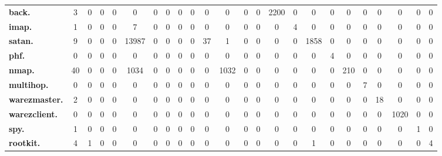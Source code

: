 \begin{tabular}{l|ccccccccccccccccccccccc}
\textbf{back.} & 3 & 0 & 0 & 0 & 0 & 0 & 0 & 0 & 0 & 0 & 0 & 0 & 0 & 2200 & 0 & 0 & 0 & 0 & 0 & 0 & 0 & 0 & 0\\
\textbf{imap.} & 1 & 0 & 0 & 0 & 7 & 0 & 0 & 0 & 0 & 0 & 0 & 0 & 0 & 0 & 4 & 0 & 0 & 0 & 0 & 0 & 0 & 0 & 0\\
\textbf{satan.} & 9 & 0 & 0 & 0 & 13987 & 0 & 0 & 0 & 0 & 37 & 1 & 0 & 0 & 0 & 0 & 1858 & 0 & 0 & 0 & 0 & 0 & 0 & 0\\
\textbf{phf.} & 0 & 0 & 0 & 0 & 0 & 0 & 0 & 0 & 0 & 0 & 0 & 0 & 0 & 0 & 0 & 0 & 4 & 0 & 0 & 0 & 0 & 0 & 0\\
\textbf{nmap.} & 40 & 0 & 0 & 0 & 1034 & 0 & 0 & 0 & 0 & 0 & 1032 & 0 & 0 & 0 & 0 & 0 & 0 & 210 & 0 & 0 & 0 & 0 & 0\\
\textbf{multihop.} & 0 & 0 & 0 & 0 & 0 & 0 & 0 & 0 & 0 & 0 & 0 & 0 & 0 & 0 & 0 & 0 & 0 & 0 & 7 & 0 & 0 & 0 & 0\\
\textbf{warezmaster.} & 2 & 0 & 0 & 0 & 0 & 0 & 0 & 0 & 0 & 0 & 0 & 0 & 0 & 0 & 0 & 0 & 0 & 0 & 0 & 18 & 0 & 0 & 0\\
\textbf{warezclient.} & 0 & 0 & 0 & 0 & 0 & 0 & 0 & 0 & 0 & 0 & 0 & 0 & 0 & 0 & 0 & 0 & 0 & 0 & 0 & 0 & 1020 & 0 & 0\\
\textbf{spy.} & 1 & 0 & 0 & 0 & 0 & 0 & 0 & 0 & 0 & 0 & 0 & 0 & 0 & 0 & 0 & 0 & 0 & 0 & 0 & 0 & 0 & 1 & 0\\
\textbf{rootkit.} & 4 & 1 & 0 & 0 & 0 & 0 & 0 & 0 & 0 & 0 & 0 & 0 & 0 & 0 & 0 & 1 & 0 & 0 & 0 & 0 & 0 & 0 & 4\\
\bottomrule
\end{tabular}
